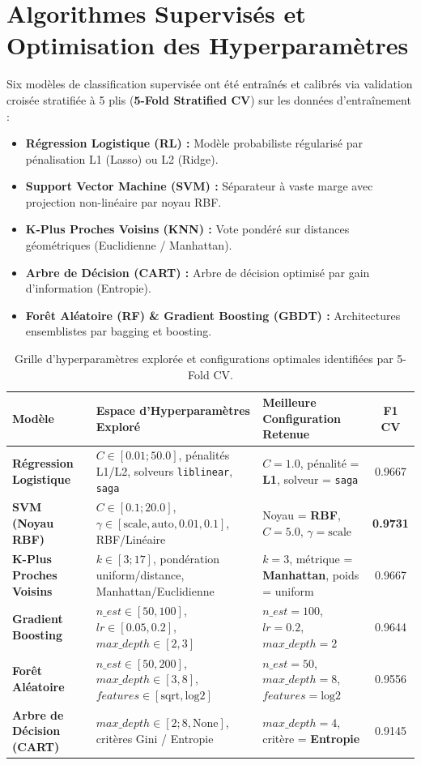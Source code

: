 \documentclass[a4paper,11pt]{report}
\begin{document}
\section{Algorithmes Supervisés et Optimisation des Hyperparamètres}
Six modèles de classification supervisée ont été entraînés et calibrés via validation croisée stratifiée à 5 plis (\textbf{5-Fold Stratified CV}) sur les données d'entraînement :
\begin{itemize}[leftmargin=0.8cm, itemsep=1pt, parsep=0pt]
	\item \textbf{Régression Logistique (RL) :} Modèle probabiliste régularisé par pénalisation L1 (Lasso) ou L2 (Ridge).
	\item \textbf{Support Vector Machine (SVM) :} Séparateur à vaste marge avec projection non-linéaire par noyau RBF.
	\item \textbf{K-Plus Proches Voisins (KNN) :} Vote pondéré sur distances géométriques (Euclidienne / Manhattan).
	\item \textbf{Arbre de Décision (CART) :} Arbre de décision optimisé par gain d'information (Entropie).
	\item \textbf{Forêt Aléatoire (RF) \& Gradient Boosting (GBDT) :} Architectures ensemblistes par bagging et boosting.
\end{itemize}

\vspace{-4pt}
\begin{table}[H]
	\centering
	\scriptsize
	\caption{Grille d'hyperparamètres explorée et configurations optimales identifiées par 5-Fold CV.}
	\label{tab:hyperparams}
	\begin{tabularx}{\textwidth}{lXXc}
		\toprule
		\textbf{Modèle} & \textbf{Espace d'Hyperparamètres Exploré} & \textbf{Meilleure Configuration Retenue} & \textbf{F1 CV} \\
		\midrule
		\textbf{Régression Logistique} & $C \in [0.01; 50.0]$, pénalités L1/L2, solveurs \texttt{liblinear}, \texttt{saga} & $C = 1.0$, pénalité = \textbf{L1}, solveur = \texttt{saga} & 0.9667 \\
		\textbf{SVM (Noyau RBF)} & $C \in [0.1; 20.0]$, $\gamma \in [\text{scale}, \text{auto}, 0.01, 0.1]$, RBF/Linéaire & Noyau = \textbf{RBF}, $C = 5.0$, $\gamma = \text{scale}$ & \textbf{0.9731} \\
		\textbf{K-Plus Proches Voisins} & $k \in [3; 17]$, pondération uniform/distance, Manhattan/Euclidienne & $k = 3$, métrique = \textbf{Manhattan}, poids = uniform & 0.9667 \\
		\textbf{Gradient Boosting} & $n\_est \in [50, 100]$, $lr \in [0.05, 0.2]$, $max\_depth \in [2, 3]$ & $n\_est = 100$, $lr = 0.2$, $max\_depth = 2$ & 0.9644 \\
		\textbf{Forêt Aléatoire} & $n\_est \in [50, 200]$, $max\_depth \in [3, 8]$, $features \in [\text{sqrt}, \text{log2}]$ & $n\_est = 50$, $max\_depth = 8$, $features = \text{log2}$ & 0.9556 \\
		\textbf{Arbre de Décision (CART)} & $max\_depth \in [2; 8, \text{None}]$, critères Gini / Entropie & $max\_depth = 4$, critère = \textbf{Entropie} & 0.9145 \\
		\bottomrule
	\end{tabularx}
\end{table}
\end{document}
